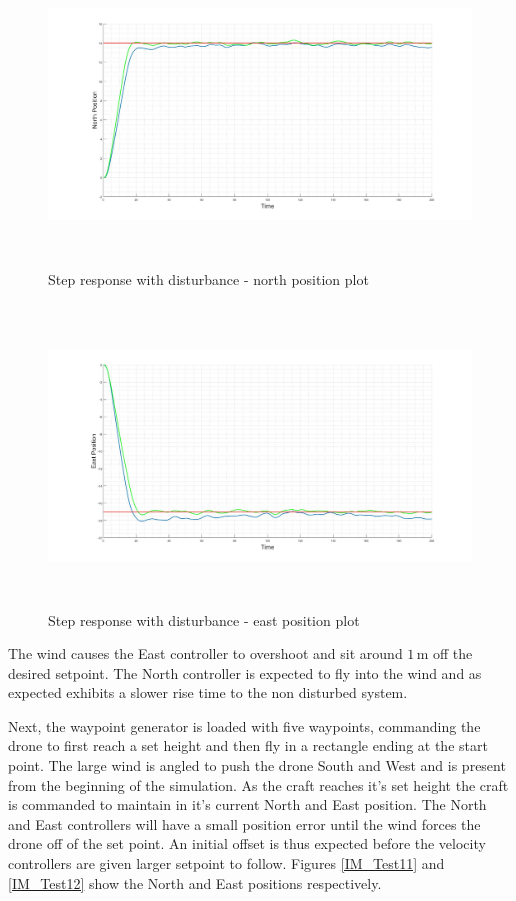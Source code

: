 		\begin{figure}[H]
			\centering
			\includegraphics[height = 8cm]{../References/Testing/SimpleWaypoint_Both_North.jpg}     
			\caption{Step response with disturbance - north position plot}
			\label{IM_Test01}
		\end{figure}
		
		\begin{figure}[H]
			\centering
			\includegraphics[height = 8cm]{../References/Testing/SimpleWaypoint_Both_East.jpg}     
			\caption{Step response with disturbance - east position plot}
			\label{IM_Test02}
		\end{figure}
		
		The wind causes the East controller to overshoot and sit around $1$\,m off the desired setpoint. The North controller is expected to fly into the wind and as expected exhibits a slower rise time to the non disturbed system.
				
		Next, the waypoint generator is loaded with five waypoints, commanding the drone to first reach a set height and then fly in a rectangle ending at the start point. The large wind is angled to push the drone South and West and is present from the beginning of the simulation. As the craft reaches it's set height the craft is commanded to maintain in it's current North and East position. The North and East controllers will have a small position error until the wind forces the drone off of the set point. An initial offset is thus expected before the velocity controllers are given larger setpoint to follow. Figures \ref{IM_Test11} and \ref{IM_Test12} show the North and East positions respectively.
		
